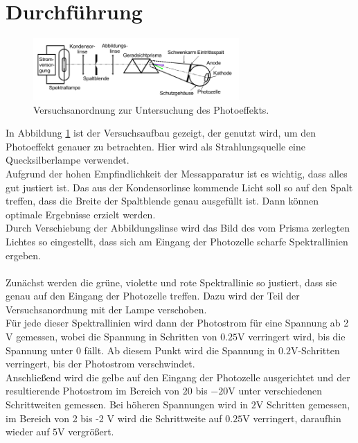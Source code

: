 \section{Durchführung}
\label{sec:Durchführung}

\begin{figure}
    \centering
    \includegraphics[width=0.7\textwidth]{aufbaru.png}
    \caption{Versuchsanordnung zur Untersuchung des Photoeffekts.}
    \label{fig:Versuchsanordnung}
\end{figure}

In Abbildung \ref{fig:Versuchsanordnung} ist der Versuchsaufbau gezeigt, der genutzt wird, um den Photoeffekt genauer zu betrachten. Hier wird als Strahlungsquelle eine 
Quecksilberlampe verwendet.\\
Aufgrund der hohen Empfindlichkeit der Messapparatur ist es wichtig, dass alles gut justiert ist. Das aus der Kondensorlinse kommende Licht soll so auf den Spalt treffen, 
dass die Breite der Spaltblende genau ausgefüllt ist. Dann können optimale Ergebnisse erzielt werden. \\
Durch Verschiebung der Abbildungslinse wird das Bild des vom Prisma zerlegten Lichtes so eingestellt, dass sich am Eingang der Photozelle scharfe Spektrallinien ergeben.\\
\\
\noindent Zunächst werden die grüne, violette und rote Spektrallinie so justiert, dass sie genau auf den Eingang der Photozelle treffen. Dazu wird der Teil der Versuchsanordnung
mit der Lampe verschoben.\\
Für jede dieser Spektrallinien wird dann der Photostrom für eine Spannung ab 2 $\si{\volt}$ gemessen, wobei die Spannung in Schritten von $0.25 \si{\volt}$ verringert wird, bis die Spannung 
unter 0 fällt. Ab diesem Punkt wird die Spannung in $0.2 \si{\volt}$-Schritten verringert, bis der Photostrom verschwindet.\\
Anschließend wird die gelbe auf den Eingang der Photozelle ausgerichtet und der resultierende Photostrom im Bereich von $20$ bis $-20 \si{\volt}$ unter verschiedenen Schrittweiten gemessen. Bei höheren
Spannungen wird in $2 \si{\volt}$ Schritten gemessen, im Bereich von 2 bis -2 $\si{\volt}$ wird die Schrittweite auf $0.25 \si{\volt}$ verringert, daraufhin wieder auf $5 \si{\volt}$ 
vergrößert.